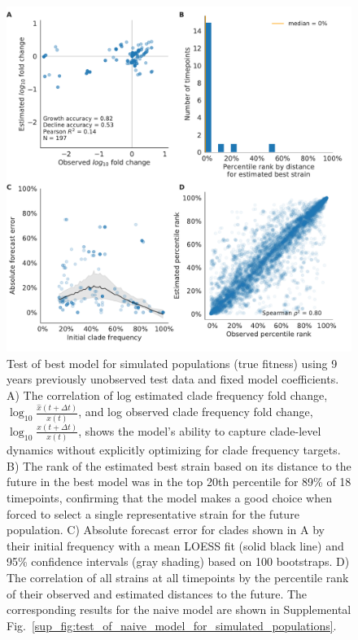 \begin{figure}[p]
  \begin{center}
  \includegraphics[width=\textwidth]{figures/validation_figure_simulated-simulated_sample_3_test_tree-normalized_fitness.pdf}
  \caption{
  Test of best model for simulated populations (true fitness) using 9 years previously unobserved test data and fixed model coefficients.
  A) The correlation of log estimated clade frequency fold change, $\log_{10}{\frac{\hat{x}(t + \Delta{t})}{x(t)}}$, and log observed clade frequency fold change, $\log_{10}{\frac{x(t + \Delta{t})}{x(t)}}$, shows the model's ability to capture clade-level dynamics without explicitly optimizing for clade frequency targets.
  B) The rank of the estimated best strain based on its distance to the future in the best model was in the top 20th percentile for 89\% of 18 timepoints, confirming that the model makes a good choice when forced to select a single representative strain for the future population.
  C) Absolute forecast error for clades shown in A by their initial frequency with a mean LOESS fit (solid black line) and 95\% confidence intervals (gray shading) based on 100 bootstraps.
  D) The correlation of all strains at all timepoints by the percentile rank of their observed and estimated distances to the future.
  The corresponding results for the naive model are shown in Supplemental Fig.~\ref{sup_fig:test_of_naive_model_for_simulated_populations}.
  }
  \label{fig:test_of_best_model_for_simulated_populations}
  \end{center}
\end{figure}

